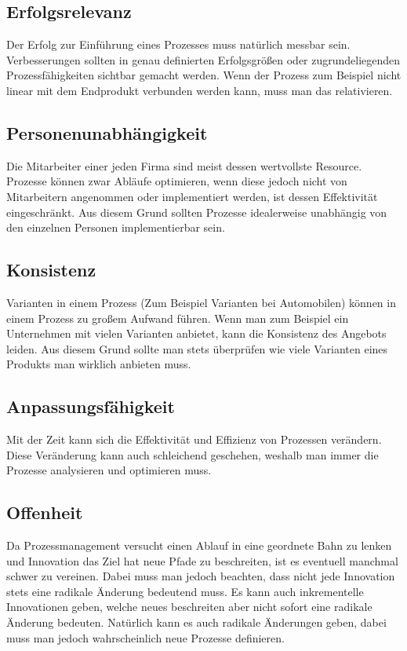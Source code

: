 \documentclass{article}
\begin{document}
  \subsection{Erfolgsrelevanz}
  Der Erfolg zur Einführung eines Prozesses muss natürlich messbar sein. Verbesserungen sollten in genau definierten Erfolgsgrößen oder zugrundeliegenden Prozessfähigkeiten sichtbar gemacht werden. Wenn der Prozess zum Beispiel nicht linear mit dem Endprodukt verbunden werden kann, muss man das relativieren.
  \subsection{Personenunabhängigkeit}
  Die Mitarbeiter einer jeden Firma sind meist dessen wertvollste Resource. Prozesse können zwar Abläufe optimieren, wenn diese jedoch nicht von Mitarbeitern angenommen oder implementiert werden, ist dessen Effektivität eingeschränkt. Aus diesem Grund sollten Prozesse idealerweise unabhängig von den einzelnen Personen implementierbar sein.
  \subsection{Konsistenz}
  Varianten in einem Prozess (Zum Beispiel Varianten bei Automobilen) können in einem Prozess zu großem Aufwand führen. Wenn man zum Beispiel ein Unternehmen mit vielen Varianten anbietet, kann die Konsistenz des Angebots leiden. Aus diesem Grund sollte man stets überprüfen wie viele Varianten eines Produkts man wirklich anbieten muss.
  \subsection{Anpassungsfähigkeit}
  Mit der Zeit kann sich die Effektivität und Effizienz von Prozessen verändern. Diese Veränderung kann auch schleichend geschehen, weshalb man immer die Prozesse analysieren und optimieren muss.
  \subsection{Offenheit}
  Da Prozessmanagement versucht einen Ablauf in eine geordnete Bahn zu lenken und Innovation das Ziel hat neue Pfade zu beschreiten, ist es eventuell manchmal schwer zu vereinen. Dabei muss man jedoch beachten, dass nicht jede Innovation stets eine radikale Änderung bedeutend muss. Es kann auch inkrementelle Innovationen geben, welche neues beschreiten aber nicht sofort eine radikale Änderung bedeuten. Natürlich kann es auch radikale Änderungen geben, dabei muss man jedoch wahrscheinlich neue Prozesse definieren.
\end{document}
